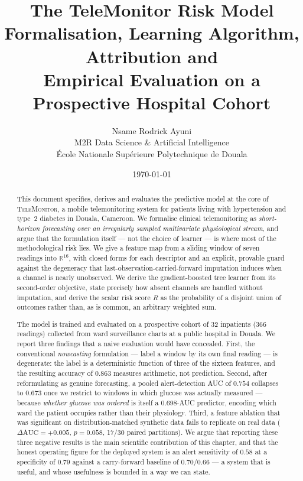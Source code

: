 \documentclass[11pt,a4paper]{article}
\title{\bfseries The TeleMonitor Risk Model\\[2mm]
\large Formalisation, Learning Algorithm, Attribution and\\
Empirical Evaluation on a Prospective Hospital Cohort}
\author{Nsame Rodrick Ayuni\\[1mm]
\small M2R Data Science \& Artificial Intelligence\\
\small École Nationale Supérieure Polytechnique de Douala}
\date{\today}
\newcommand{\R}{\mathbb{R}}
\begin{document}
\maketitle

\begin{abstract}
\noindent
This document specifies, derives and evaluates the predictive model at the core of
\textsc{TeleMonitor}, a mobile telemonitoring system for patients living with
hypertension and type~2 diabetes in Douala, Cameroon. We formalise clinical
telemonitoring as \emph{short-horizon forecasting over an irregularly sampled
multivariate physiological stream}, and argue that the formulation itself --- not
the choice of learner --- is where most of the methodological risk lies. We give
a feature map from a sliding window of seven readings into $\R^{16}$, with closed
forms for each descriptor and an explicit, provable guard against the degeneracy
that last-observation-carried-forward imputation induces when a channel is nearly
unobserved. We derive the gradient-boosted tree learner from its second-order
objective, state precisely how absent channels are handled without imputation, and
derive the scalar risk score $R$ as the probability of a disjoint union of
outcomes rather than, as is common, an arbitrary weighted sum.

The model is trained and evaluated on a prospective cohort of 32 inpatients
(366 readings) collected from ward surveillance charts at a public hospital in
Douala. We report three findings that a naive evaluation would have concealed.
First, the conventional \emph{nowcasting} formulation --- label a window by its own
final reading --- is degenerate: the label is a deterministic function of three of
the sixteen features, and the resulting accuracy of $0.863$ measures arithmetic,
not prediction. Second, after reformulating as genuine forecasting, a pooled
alert-detection AUC of $0.754$ collapses to $0.673$ once we restrict to windows in
which glucose was actually measured --- because \emph{whether glucose was ordered}
is itself a 0.698-AUC predictor, encoding which ward the patient occupies rather
than their physiology. Third, a feature ablation that was significant on
distribution-matched synthetic data fails to replicate on real data
($\Delta\mathrm{AUC}=+0.005$, $p=0.058$, 17/30 paired partitions).
We argue that reporting these three negative results is the main scientific
contribution of this chapter, and that the honest operating figure for the
deployed system is an alert sensitivity of $0.58$ at a specificity of $0.79$
against a carry-forward baseline of $0.70/0.66$ --- a system that is useful, and
whose usefulness is bounded in a way we can state.
\end{abstract}
\end{document}
